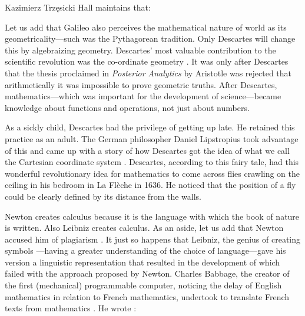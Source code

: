 \begin{artengenv}{Kazimierz Trzęsicki}
Hall \parencite*[p.97]{Hall1956}  maintains that: 

Let us add that Galileo also perceives the mathematical nature of world as its geometricality---such was the Pythagorean tradition. Only Descartes will change this by algebraizing geometry.  Descartes' most valuable contribution to the scientific revolution was the co-ordinate geometry \parencite[
p.200]{Hall1956}.  It was only after Descartes that the thesis proclaimed in \emph{Posterior Analytics} by Aristotle was rejected that arithmetically it was impossible to prove geometric truths. After Descartes, mathematics---which was important for the development of science---became knowledge about functions and operations, not just about numbers.

As a sickly child, Descartes had the privilege of getting up late. He retained this practice as an adult. The German philosopher Daniel Lipstropius took advantage of this and came up with a story of how Descartes got the idea of what we call the Cartesian coordinate system \parencite[pp.111--112] {Mazur2014}. Descartes, according to this fairy tale, had this wonderful revolutionary idea for mathematics to come across flies crawling on the ceiling in his bedroom in La Flèche in 1636. He noticed that the position of a fly could be clearly defined by its distance from the walls.

Newton creates calculus because it is the language with which the book of nature is written. Also Leibniz creates calculus. As an aside, let us add that Newton accused him of plagiarism \parencite{Sonar2018}. It just so happens that Leibniz, the genius of creating symbols \parencite['The Symbol Master', cf.][pp.165--168]{Mazur2014}---having a greater understanding of the choice of language---gave his version a linguistic representation that resulted in the development of which failed with the approach proposed by Newton. Charles Babbage, the creator of the first (mechanical) programmable computer, noticing the delay of English mathematics in relation to French mathematics, undertook to translate French texts from mathematics \parencite{Trzesicki2006c}. He wrote \parencite*{Babbage1864,Babbage2008}: 


\end{artengenv}
